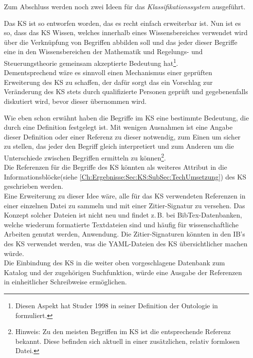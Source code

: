 Zum Abschluss werden noch zwei Ideen für das \textit{Klassifikationssystem} ausgeführt.

Das KS ist so entworfen worden, das es recht einfach erweiterbar ist. Nun ist es so, dass das KS Wissen, welches innerhalb eines Wissensbereiches verwendet wird über die Verknüpfung von Begriffen abbilden soll und das jeder dieser Begriffe eine in den Wissensbereichen der Mathematik und Regelungs- und Steuerungstheorie gemeinsam akzeptierte Bedeutung hat\footnote{Diesen Aspekt hat Studer 1998 in seiner Definition der Ontologie in \cite[Abschnitt 6.1]{STBEFE98} formuliert.}.\\
Dementsprechend wäre es sinnvoll einen Mechanismus einer geprüften Erweiterung des KS zu schaffen, der dafür sorgt das ein Vorschlag zur Veränderung des KS stets durch qualifizierte Personen geprüft und gegebenenfalls diskutiert wird, bevor dieser übernommen wird.

Wie eben schon erwähnt haben die Begriffe im KS eine bestimmte Bedeutung, die durch eine Definition festgelegt ist. Mit wenigen Ausnahmen ist eine Angabe dieser Definition oder einer Referenz zu dieser notwendig, zum Einen um sicher zu stellen, das jeder den Begriff gleich interpretiert und zum Anderen um die Unterschiede zwischen Begriffen ermitteln zu können\footnote{Hinweis: Zu den meisten Begriffen im KS ist die entsprechende Referenz bekannt. Diese befinden sich aktuell in einer zusätzlichen, relativ formlosen Datei.}.\\
Die Referenzen für die Begriffe des KS könnten als weiteres Attribut in die Informationsblöcke(siehe \autoref{Ch:Ergebnisse:Sec:KS:SubSec:TechUmsetzung}) des KS geschrieben werden.\\
Eine Erweiterung zu dieser Idee wäre, alle für das KS verwendeten Referenzen in einer einzelnen Datei zu sammeln und mit einer Zitier-Signatur zu versehen. Das Konzept solcher Dateien ist nicht neu und findet z.\,B. bei BibTex-Datenbanken, welche wiederum formatierte Textdateien sind und häufig für wissenschaftliche Arbeiten genutzt werden, Anwendung. Die Zitier-Signaturen könnten in den IB's des KS verwendet werden, was die YAML-Dateien des KS übersichtlicher machen würde. \\
Die Einbindung des KS in die weiter oben vorgeschlagene Datenbank zum Katalog und der zugehörigen Suchfunktion, würde eine Ausgabe der Referenzen in einheitlicher Schreibweise ermöglichen.



